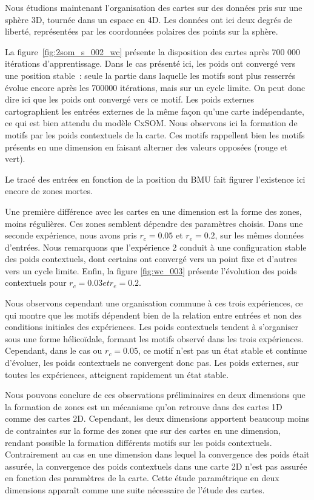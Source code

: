 \documentclass[../main]{subfiles}
\begin{document}
Nous étudions maintenant l'organisation des cartes sur des données pris sur une sphère 3D, tournée dans un espace en 4D. Les données ont ici deux degrés de liberté, représentées par les coordonnées polaires des points sur la sphère. 

La figure~\ref{fig:2som_s_002_wc} présente la disposition des cartes après 700 000 itérations d'apprentissage. 
Dans le cas présenté ici, les poids ont convergé vers une position stable~: seule la partie dans laquelle les motifs sont plus resserrés évolue encore après les 700000 itérations, mais sur un cycle limite. On peut donc dire ici que les poids ont convergé vers ce motif.
Les poids externes cartographient les entrées externes de la même façon qu'une carte indépendante, ce qui est bien attendu du modèle CxSOM. 
Nous observons ici la formation de motifs par les poids contextuels de la carte. Ces motifs rappellent bien les motifs présents en une dimension en faisant alterner des valeurs opposées (rouge et vert).

Le tracé des entrées en fonction de la position du BMU fait figurer l'existence ici encore de zones mortes.

Une première différence avec les cartes en une dimension est la forme des zones, moins régulières. Ces zones semblent dépendre des paramètres choisis. 
Dans une seconde expérience, nous avons pris $r_c = 0.05$ et $r_e = 0.2$, sur les mêmes données d'entrées. 
Nous remarquons que l'expérience 2 conduit à une configuration stable des poids contextuels, dont certains ont convergé vers un point fixe et d'autres vers un cycle limite. 
Enfin, la figure \ref{fig:wc_003} présente l'évolution des poids contextuels pour $r_c = 0.03 et r_e = 0.2$. 

Nous observons cependant une organisation commune à ces trois expériences, ce qui montre que les motifs dépendent bien de la relation entre entrées et non des conditions initiales des expériences. Les poids contextuels tendent à s'organiser sous une forme hélicoïdale, formant les motifs observé dans les trois expériences. 
Cependant, dans le cas ou $r_c = 0.05$, ce motif n'est pas un état stable et continue d'évoluer, les poids contextuels ne convergent donc pas.
Les poids externes, sur toutes les expériences, atteignent rapidement un état stable.

Nous pouvons conclure de ces observations préliminaires en deux dimensions que la formation de zones est un mécanisme qu'on retrouve dans des cartes 1D comme des cartes 2D. Cependant, les deux dimensions apportent beaucoup moins de contraintes sur la forme des zones que sur des cartes en une dimension, rendant possible la formation différents motifs sur les poids contextuels. 
Contrairement au cas en une dimension dans lequel la convergence des poids était assurée, la convergence des poids contextuels dans une carte 2D n'est pas assurée en fonction des paramètres de la carte. Cette étude paramétrique en deux dimensions apparaît comme une suite nécessaire de l'étude des cartes.
\end{document}
